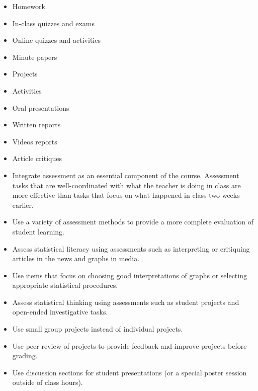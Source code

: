 \vspace{.2in}

\noindent{}
\begin{itemize}[leftmargin=1cm, itemsep=.2em]
\item Homework
\item In-class quizzes and exams
\item Online quizzes and activities
\item Minute papers
\item Projects
\item Activities
\item Oral presentations
\item Written reports
\item Videos reports
\item Article critiques
\end{itemize}

 \vspace{.2in}
\noindent{}

\renewcommand{\labelitemi}{$\checkmark$}

\begin{itemize}[leftmargin=1cm, itemsep=.2em]
\item Integrate assessment as an essential component of the course. Assessment tasks that are well-coordinated with what the teacher is doing in class are more effective than tasks that focus on what happened in class two weeks earlier.
\item Use a variety of assessment methods to provide a more complete evaluation of student learning.
\item Assess statistical literacy using assessments such as interpreting or critiquing articles in the news and graphs in media.
\item Use items that focus on choosing good interpretations of graphs or selecting appropriate statistical procedures.
\item Assess statistical thinking using assessments such as student projects and open-ended investigative tasks.
\end{itemize}
 
 \vspace{.2in}
\noindent{}
\begin{itemize}[leftmargin=1cm, itemsep=.2em]
\item Use small group projects instead of individual projects.
\item Use peer review of projects to provide feedback and improve projects before grading.
\item Use discussion sections for student presentations (or a special poster session outside of class hours).
\end{itemize}


